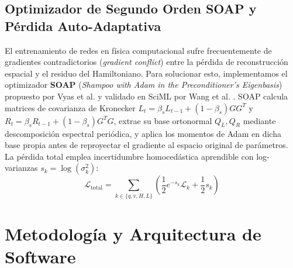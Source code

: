 \documentclass[11pt,a4paper]{article}
\begin{document}
\subsection{Optimizador de Segundo Orden SOAP y Pérdida Auto-Adaptativa}
El entrenamiento de redes en física computacional sufre frecuentemente de gradientes contradictorios (\textit{gradient conflict}) entre la pérdida de reconstrucción espacial y el residuo del Hamiltoniano. Para solucionar esto, implementamos el optimizador \textbf{SOAP} (\textit{Shampoo with Adam in the Preconditioner's Eigenbasis}) propuesto por Vyas et al. \cite{vyas2024soap} y validado en SciML por Wang et al. \cite{wang2025gradient}. SOAP calcula matrices de covarianza de Kronecker $L_t = \beta_s L_{t-1} + (1-\beta_s) G G^T$ y $R_t = \beta_s R_{t-1} + (1-\beta_s) G^T G$, extrae su base ortonormal $Q_L, Q_R$ mediante descomposición espectral periódica, y aplica los momentos de Adam en dicha base propia antes de reproyectar el gradiente al espacio original de parámetros.
La pérdida total emplea incertidumbre homocedástica aprendible con log-varianzas $s_k = \log(\sigma_k^2)$:
\begin{equation}
    \mathcal{L}_{\text{total}} = \sum_{k \in \{q, v, H, L\}} \left( \frac{1}{2} e^{-s_k} \mathcal{L}_k + \frac{1}{2} s_k \right)
\end{equation}

\section{Metodología y Arquitectura de Software}
\end{document}
